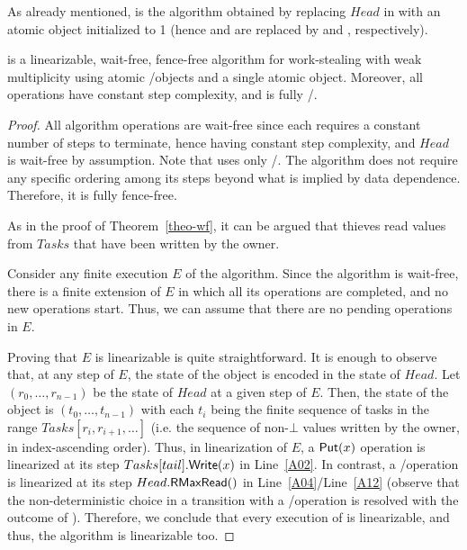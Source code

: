 As already mentioned, \NCWSM is the algorithm obtained by replacing \(Head\) in \WFWSM with an atomic \RangeMaxReg object initialized to 1 (hence \MaxR and \MaxW are replaced by \RMaxR and \RMaxW, respectively).


\begin{theorem}\label{theo-wf-nc}
\NCWSM is a linearizable, wait-free, fence-free algorithm for work-stealing with weak multiplicity using atomic \R/\W objects and a single atomic \RangeMaxReg object.  Moreover, all operations have constant step complexity, and \Put is fully \R/\W.
\end{theorem}

\begin{proof}

All algorithm operations are wait-free since each requires a constant number of steps to terminate, hence having constant step complexity, and \(Head\) is wait-free by assumption.  Note that \Put uses only \R/\W.  The algorithm does not require any specific ordering among its steps beyond what is implied by data dependence. Therefore, it is fully fence-free.

As in the proof of Theorem~\ref{theo-wf}, it can be argued that thieves read values from \(Tasks\) that have been written by the owner.

Consider any finite execution \(E\) of the algorithm.  Since the algorithm is wait-free, there is a finite extension of \(E\) in which all its operations are completed, and no new operations start. Thus, we can assume that there are no pending operations in \(E\).

Proving that \(E\) is linearizable is quite straightforward. It is enough to observe that, at any step of \(E\), the state of the object is encoded in the state of \(Head\). Let \((r_0, \hdots, r_{n-1})\) be the state of \(Head\) at a given step of \(E\). Then, the state of the object is \((t_0, \hdots, t_{n-1})\) with each \(t_i\) being the finite sequence of tasks in the range \(Tasks[r_i, r_{i+1}, \hdots]\) (i.e. the sequence of non-\(\bot\) values written by the owner, in index-ascending order).  Thus, in linearization of \(E\), a \({\sf \small Put}(x)\) operation is linearized at its step \(Tasks[tail].{\sf \small Write}(x)\) in Line~\ref{A02}. In contrast, a \Take/\Steal operation is linearized at its step \(Head.{\sf \small RMaxRead}()\) in Line~\ref{A04}/Line~\ref{A12} (observe that the non-deterministic choice in a transition with a \Take/\Steal operation is resolved with the outcome of \RMaxR).  Therefore, we conclude that every execution of \NCWSM is linearizable, and thus, the algorithm is linearizable too.
\end{proof}

